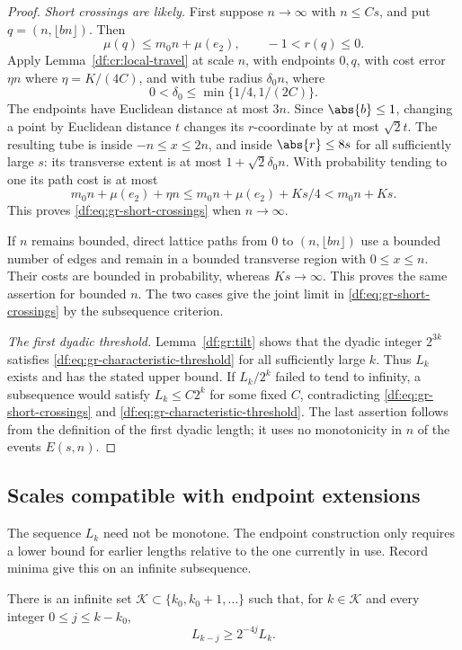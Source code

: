 \begin{proof}
\emph{Short crossings are likely.}
First suppose $n\to\infty$ with $n\leq Cs$, and put
$q=(n,\lfloor bn\rfloor)$. Then
\[
 \mu(q)\leq m_0n+\mu(e_2),\qquad -1<r(q)\leq0.
\]
Apply Lemma~\ref{df:cr:local-travel} at scale $n$, with endpoints $0,q$,
with cost error $\eta n$ where $\eta=K/(4C)$, and with tube radius
$\delta_0n$, where
\[
 0<\delta_0\leq\min\{1/4,1/(2C)\}.
\]
The endpoints have Euclidean distance at most $3n$. Since
$\abs{b}\leq1$, changing a point by Euclidean distance $t$ changes its
$r$-coordinate by at most $\sqrt2t$. The resulting tube is inside
$-n\leq x\leq2n$, and inside $\abs{r}\leq8s$ for all sufficiently large
$s$: its transverse extent is at most $1+\sqrt2\delta_0n$. With
probability tending to one its path cost is at most
\[
 m_0n+\mu(e_2)+\eta n
 \leq m_0n+\mu(e_2)+Ks/4
 <m_0n+Ks.
\]
This proves \eqref{df:eq:gr-short-crossings} when $n\to\infty$.

If $n$ remains bounded, direct lattice paths from $0$ to
$(n,\lfloor bn\rfloor)$ use a bounded number of edges and remain in a
bounded transverse region with $0\leq x\leq n$. Their costs are bounded
in probability, whereas $Ks\to\infty$. This proves the same assertion
for bounded $n$. The two cases give the joint limit in
\eqref{df:eq:gr-short-crossings} by the subsequence criterion.

\emph{The first dyadic threshold.}
Lemma~\ref{df:gr:tilt} shows that the dyadic integer $2^{3k}$ satisfies
\eqref{df:eq:gr-characteristic-threshold} for all sufficiently large $k$.
Thus $L_k$ exists and has the stated upper bound. If $L_k/2^k$ failed to
tend to infinity, a subsequence would satisfy $L_k\leq C2^k$ for some
fixed $C$, contradicting \eqref{df:eq:gr-short-crossings} and
\eqref{df:eq:gr-characteristic-threshold}. The last assertion follows from
the definition of the first dyadic length; it uses no monotonicity in
$n$ of the events $E(s,n)$.
\end{proof}

\subsection{Scales compatible with endpoint extensions}

The sequence $L_k$ need not be monotone. The endpoint construction
only requires a lower bound for earlier lengths relative to the one
currently in use. Record minima give this on an infinite subsequence.

\begin{lemma}\label{df:gr:record-scales}
There is an infinite set $\mathcal K\subset\{k_0,k_0+1,\ldots\}$ such that,
for $k\in\mathcal K$ and every integer $0\leq j\leq k-k_0$,
\begin{equation}\label{df:eq:gr-record-comparison}
 L_{k-j}\geq2^{-4j}L_k.
\end{equation}
\end{lemma}


